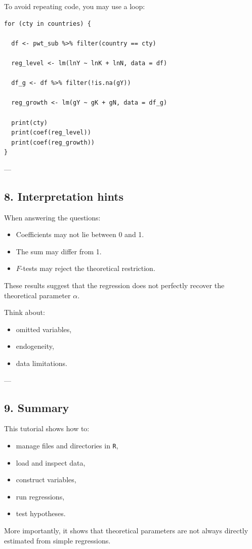 \documentclass[12pt]{article}
\begin{document}
To avoid repeating code, you may use a loop:

\begin{verbatim}
for (cty in countries) {

  df <- pwt_sub %>% filter(country == cty)

  reg_level <- lm(lnY ~ lnK + lnN, data = df)

  df_g <- df %>% filter(!is.na(gY))

  reg_growth <- lm(gY ~ gK + gN, data = df_g)

  print(cty)
  print(coef(reg_level))
  print(coef(reg_growth))
}
\end{verbatim}

---

\subsection*{8. Interpretation hints}

When answering the questions:

\begin{itemize}
    \item Coefficients may not lie between 0 and 1.
    \item The sum may differ from 1.
    \item $F$-tests may reject the theoretical restriction.
\end{itemize}

These results suggest that the regression does not perfectly recover the theoretical parameter $\alpha$.

Think about:
\begin{itemize}
    \item omitted variables,
    \item endogeneity,
    \item data limitations.
\end{itemize}

---

\subsection*{9. Summary}

This tutorial shows how to:
\begin{itemize}
    \item manage files and directories in \texttt{R},
    \item load and inspect data,
    \item construct variables,
    \item run regressions,
    \item test hypotheses.
\end{itemize}

More importantly, it shows that theoretical parameters are not always directly estimated from simple regressions.
\end{document}
